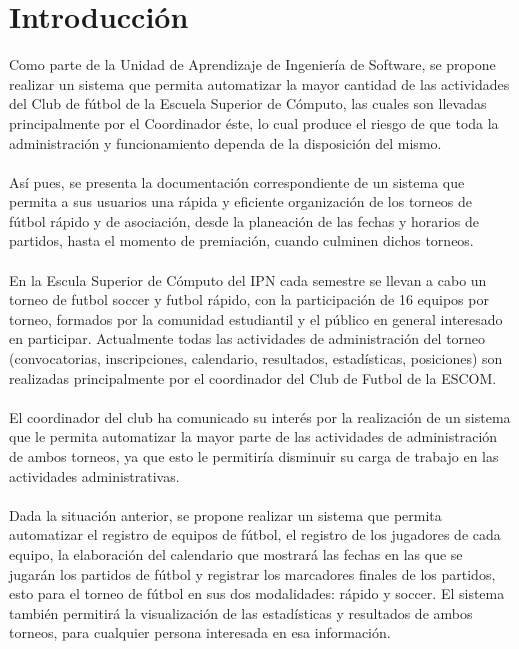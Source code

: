 \section{Introducción}

Como parte de la Unidad de Aprendizaje de Ingeniería de Software, se propone realizar un sistema que permita automatizar la mayor cantidad de las actividades del Club de fútbol de la Escuela Superior de Cómputo, las cuales son llevadas principalmente por el Coordinador éste, lo cual produce el riesgo de que toda la administración y funcionamiento dependa de la disposición del mismo.\\ \\

Así pues, se presenta la documentación correspondiente de un sistema que permita a sus usuarios una rápida y eficiente organización de los torneos de fútbol rápido y de asociación, desde la planeación de las fechas y horarios de partidos, hasta el momento de premiación, cuando culminen dichos torneos.\\ \\

En la Escula Superior de Cómputo del IPN cada semestre se llevan a cabo un torneo de futbol soccer y futbol rápido, con la participación de 16 equipos por torneo, formados por la comunidad estudiantil y el público en general interesado en participar. Actualmente todas las actividades de administración del torneo (convocatorias, inscripciones, calendario, resultados, estadísticas, posiciones) son realizadas principalmente por el coordinador del Club de Futbol de la ESCOM.\\ \\

El coordinador del club ha comunicado su interés por la realización de un sistema que le permita automatizar la mayor parte de las actividades de administración de ambos torneos, ya que esto le permitiría disminuir su carga de trabajo en las actividades administrativas.\\ \\

Dada la situación anterior, se propone realizar un sistema que permita automatizar el registro de equipos de fútbol, el registro de los jugadores de cada equipo, la elaboración del calendario que mostrará las fechas en las que se jugarán los partidos de fútbol y registrar los marcadores finales de los partidos, esto para el torneo de fútbol en sus dos modalidades: rápido y soccer. El sistema también permitirá la visualización de las estadísticas y resultados de ambos torneos, para cualquier persona interesada en esa información.\\ \\

